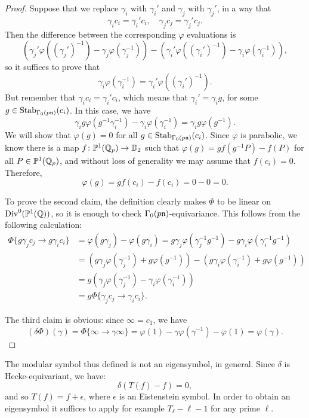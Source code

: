 \documentclass[a4paper,10pt]{article}
\numberwithin{equation}{section}
\begin{document}
\begin{proof}
Suppose that we replace $\gamma_i$ with $\gamma_i'$ and $\gamma_j$ with $\gamma_j'$, in a way that
\[
\gamma_ic_i=\gamma_i'c_i,\quad \gamma_jc_j=\gamma_j'c_j.
\]
Then the difference between the corresponding $\varphi$ evaluations is
\[
\left(\gamma_j'\varphi((\gamma_j')^{-1})-\gamma_j\varphi(\gamma_j^{-1})\right) - \left(\gamma_i'\varphi((\gamma_i')^{-1})-\gamma_i\varphi(\gamma_i^{-1})\right),
\]
so it suffices to prove that
\[
\gamma_i\varphi(\gamma_i^{-1}) = \gamma_i'\varphi((\gamma_i')^{-1}).
\]
But remember that $\gamma_ic_i =\gamma_i'c_i$, which means that $\gamma_i'= \gamma_i g$, for some $g\in\operatorname{Stab}_{\Gamma_0(p\mathfrak{n})}(c_i)$. In this case, we have
\[
\gamma_i g \varphi(g^{-1} \gamma_i^{-1}) - \gamma_i \varphi(\gamma_i^{-1}) = \gamma_i g \varphi(g^{-1}).
\]
We will show that $\varphi(g)=0$ for all $g\in\operatorname{Stab}_{\Gamma_0(p\mathfrak{n})}(c_i)$. Since $\varphi$ is parabolic, we know there is a map $f\colon \mathbb{P}^1(\mathbb{Q}_p)\to \mathbb{D}_2$ such that $\varphi(g) = gf(g^{-1}P) - f(P)$ for all $P\in \mathbb{P}^1(\mathbb{Q}_p)$, and without loss of generality we may assume that $f(c_i)=0$. Therefore,
\[
\varphi(g)=gf(c_i)-f(c_i) = 0 -0=0.
\]

To prove the second claim, the definition clearly makes $\Phi$ to be linear on $\mathrm{Div}^0(\mathbb{P}^1(\mathbb{Q}))$, so it is enough to check $\Gamma_0(p\mathfrak{n})$-equivariance. This follows from the following calculation:
\begin{align*}
\Phi\{g\gamma_jc_j\rightarrow g\gamma_ic_i\}&=\varphi(g\gamma_j)-\varphi(g\gamma_i) = 
g\gamma_j\varphi(\gamma_j^{-1}g^{-1}) - g\gamma_i\varphi(\gamma_i^{-1}g^{-1})\\
&=\left(g\gamma_j\varphi(\gamma_j^{-1}) + g\varphi(g^{-1})\right) -\left(g\gamma_i\varphi(\gamma_i^{-1}) + g\varphi(g^{-1})\right)\\
&= g\left(\gamma_j\varphi(\gamma_j^{-1}) - \gamma_i\varphi(\gamma_i^{-1})\right)\\
&=g\Phi\{\gamma_jc_j\rightarrow \gamma_ic_i\}.
\end{align*}

The third claim is obvious: since $\infty=c_1$, we have
\[
(\delta\Phi)(\gamma)=\Phi\{\infty\rightarrow\gamma\infty\} = \varphi(1)-\gamma\varphi(\gamma^{-1})-\varphi(1)=\varphi(\gamma).
\]
\end{proof}

The modular symbol thus defined is not an eigensymbol, in general. Since $\delta$ is Hecke-equivariant, we have:
\[
\delta(T(f) - f) = 0,
\]
and so $T(f) = f + \epsilon$, where $\epsilon$ is an Eistenstein symbol. In order to obtain an eigensymbol it suffices to apply for example $T_\ell-\ell-1$ for any prime $\ell$.
\end{document}
